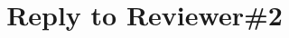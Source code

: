 \documentclass[preprint,3p,times]{elsarticle}
\begin{document}
\begin{frontmatter}
    \title{Reply to Reviewer\#2}
\end{frontmatter}

\renewcommand{\figurename}[1]{Fig.R2.#1}








\end{document}
